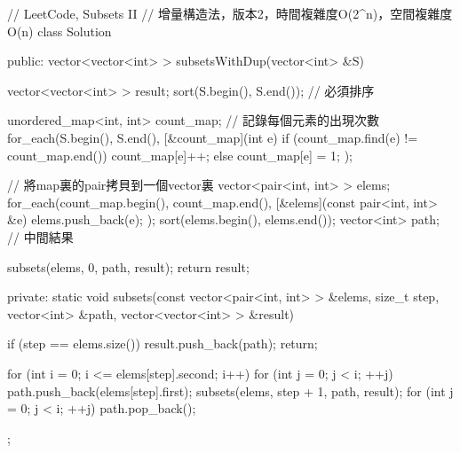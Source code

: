 \begin{Code}
// LeetCode, Subsets II
// 增量構造法，版本2，時間複雜度O(2^n)，空間複雜度O(n)
class Solution {
public:
    vector<vector<int> > subsetsWithDup(vector<int> &S) {
        vector<vector<int> > result;
        sort(S.begin(), S.end()); // 必須排序

        unordered_map<int, int> count_map; // 記錄每個元素的出現次數
        for_each(S.begin(), S.end(), [&count_map](int e) {
            if (count_map.find(e) != count_map.end())
                count_map[e]++;
            else
                count_map[e] = 1;
        });

        // 將map裏的pair拷貝到一個vector裏
        vector<pair<int, int> > elems;
        for_each(count_map.begin(), count_map.end(),
                [&elems](const pair<int, int> &e) {
                    elems.push_back(e);
                });
        sort(elems.begin(), elems.end());
        vector<int> path; // 中間結果

        subsets(elems, 0, path, result);
        return result;
    }

private:
    static void subsets(const vector<pair<int, int> > &elems,
            size_t step, vector<int> &path, vector<vector<int> > &result) {
        if (step == elems.size()) {
            result.push_back(path);
            return;
        }

        for (int i = 0; i <= elems[step].second; i++) {
            for (int j = 0; j < i; ++j) {
                path.push_back(elems[step].first);
            }
            subsets(elems, step + 1, path, result);
            for (int j = 0; j < i; ++j) {
                path.pop_back();
            }
        }
    }
};
\end{Code}


